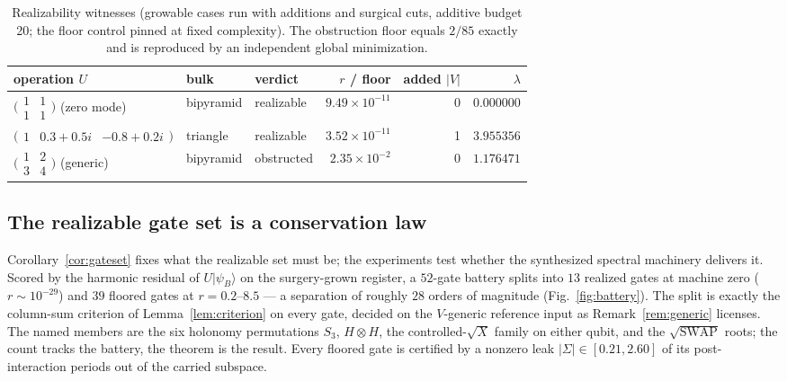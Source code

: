 \documentclass[a4paper,twocolumn,11pt,unpublished]{quantumarticle}
\theoremstyle{plain}
\theoremstyle{remark}
\newcommand{\ket}[1]{|#1\rangle}
\begin{document}
\begin{table}[t]
\centering
\begin{tabular}{lllrrr}
\toprule
operation $U$ & bulk & verdict & $r$ / floor & added $|V|$ & $\lambda$ \\
\midrule
$\bigl(\begin{smallmatrix}1&1\\1&1\end{smallmatrix}\bigr)$ (zero mode) &
bipyramid & realizable & $9.49\times10^{-11}$ & 0 & $0.000000$ \\
$\bigl(\begin{smallmatrix}1&0.3{+}0.5i&-0.8{+}0.2i\end{smallmatrix}\bigr)$ &
triangle & realizable & $3.52\times10^{-11}$ & 1 & $3.955356$ \\
$\bigl(\begin{smallmatrix}1&2\\3&4\end{smallmatrix}\bigr)$ (generic) &
bipyramid & obstructed & $2.35\times10^{-2}$ & 0 & $1.176471$ \\
\bottomrule
\end{tabular}
\caption{Realizability witnesses (growable cases run with additions and
surgical cuts, additive budget 20; the floor control pinned at fixed
complexity). The obstruction floor equals $2/85$ exactly and is reproduced
by an independent global minimization.}
\label{tab:witnesses}
\end{table}

\subsection{The realizable gate set is a conservation law}
\label{sec:results-gates}

Corollary~\ref{cor:gateset} fixes what the realizable set must be; the
experiments test whether the synthesized spectral machinery delivers it.
Scored by the harmonic residual of $U\ket{\psi_B}$ on the surgery-grown
register, a $52$-gate battery splits into $13$ realized gates at machine
zero ($r\sim10^{-29}$) and $39$ floored gates at $r=0.2$--$8.5$ --- a
separation of roughly $28$ orders of magnitude
(Fig.~\ref{fig:battery}). The split is exactly the column-sum criterion
of Lemma~\ref{lem:criterion} on every gate, decided on the $V$-generic
reference input as Remark~\ref{rem:generic} licenses. The named members
are the six holonomy permutations $S_3$, $H\otimes H$, the
controlled-$\sqrt{X}$ family on either qubit, and the
$\sqrt{\mathrm{SWAP}}$ roots; the count tracks the battery, the theorem
is the result. Every floored gate is certified by a nonzero leak
$|\Sigma|\in[0.21,2.60]$ of its post-interaction periods out of the
carried subspace.
\end{document}

